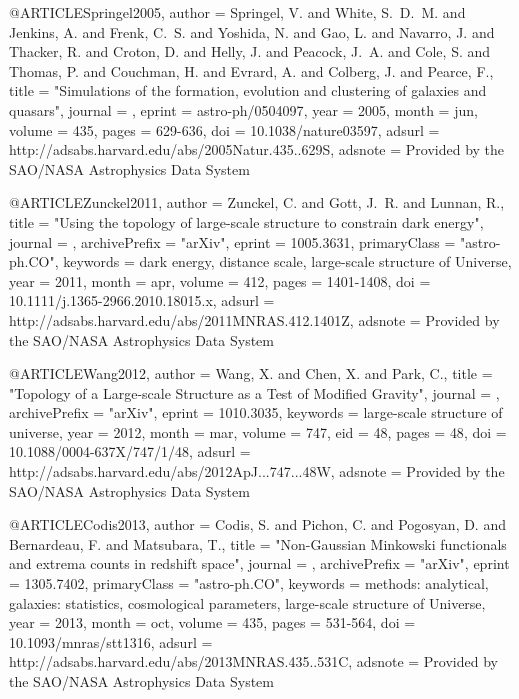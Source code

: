 \documentclass{aa}
\begin{document}
{{{{{{{{{{{{{@ARTICLE{Springel2005,
   author = {{Springel}, V. and {White}, S.~D.~M. and {Jenkins}, A. and {Frenk}, C.~S. and 
	{Yoshida}, N. and {Gao}, L. and {Navarro}, J. and {Thacker}, R. and 
	{Croton}, D. and {Helly}, J. and {Peacock}, J.~A. and {Cole}, S. and 
	{Thomas}, P. and {Couchman}, H. and {Evrard}, A. and {Colberg}, J. and 
	{Pearce}, F.},
    title = "{Simulations of the formation, evolution and clustering of galaxies and quasars}",
  journal = {\nat},
   eprint = {astro-ph/0504097},
     year = 2005,
    month = jun,
   volume = 435,
    pages = {629-636},
      doi = {10.1038/nature03597},
   adsurl = {http://adsabs.harvard.edu/abs/2005Natur.435..629S},
  adsnote = {Provided by the SAO/NASA Astrophysics Data System}
}

@ARTICLE{Zunckel2011,
   author = {{Zunckel}, C. and {Gott}, J.~R. and {Lunnan}, R.},
    title = "{Using the topology of large-scale structure to constrain dark energy}",
  journal = {\mnras},
archivePrefix = "arXiv",
   eprint = {1005.3631},
 primaryClass = "astro-ph.CO",
 keywords = {dark energy, distance scale, large-scale structure of Universe},
     year = 2011,
    month = apr,
   volume = 412,
    pages = {1401-1408},
      doi = {10.1111/j.1365-2966.2010.18015.x},
   adsurl = {http://adsabs.harvard.edu/abs/2011MNRAS.412.1401Z},
  adsnote = {Provided by the SAO/NASA Astrophysics Data System}
}

@ARTICLE{Wang2012,
   author = {{Wang}, X. and {Chen}, X. and {Park}, C.},
    title = "{Topology of a Large-scale Structure as a Test of Modified Gravity}",
  journal = {\apj},
archivePrefix = "arXiv",
   eprint = {1010.3035},
 keywords = {large-scale structure of universe},
     year = 2012,
    month = mar,
   volume = 747,
      eid = {48},
    pages = {48},
      doi = {10.1088/0004-637X/747/1/48},
   adsurl = {http://adsabs.harvard.edu/abs/2012ApJ...747...48W},
  adsnote = {Provided by the SAO/NASA Astrophysics Data System}
}

@ARTICLE{Codis2013,
   author = {{Codis}, S. and {Pichon}, C. and {Pogosyan}, D. and {Bernardeau}, F. and 
	{Matsubara}, T.},
    title = "{Non-Gaussian Minkowski functionals and extrema counts in redshift space}",
  journal = {\mnras},
archivePrefix = "arXiv",
   eprint = {1305.7402},
 primaryClass = "astro-ph.CO",
 keywords = {methods: analytical, galaxies: statistics, cosmological parameters, large-scale structure of Universe},
     year = 2013,
    month = oct,
   volume = 435,
    pages = {531-564},
      doi = {10.1093/mnras/stt1316},
   adsurl = {http://adsabs.harvard.edu/abs/2013MNRAS.435..531C},
  adsnote = {Provided by the SAO/NASA Astrophysics Data System}
}

}}}}}}}}}}}}}
\end{document}

